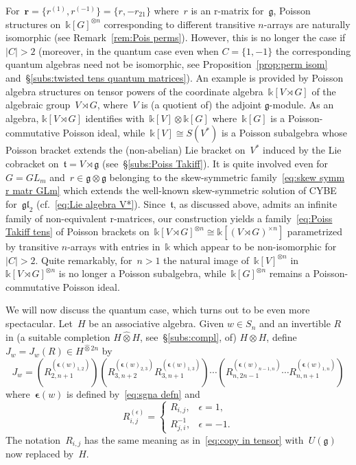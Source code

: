 \documentclass[12pt, reqno]{amsart}
\theoremstyle{definition}
\numberwithin{equation}{section}
\newcommand{\tensor}{\otimes}
\newcommand{\kk}{\mathbb{k}}\newcommand{\lie}[1]{{\mathfrak{#1}}}
\newcommand{\sgna}[1]{\boldsymbol{\epsilon}(#1)}
\begin{document}
For~$\mathbf r=
\{r^{(1)},r^{(-1)}\}=
\{r,-r_{21}\}$ where~$r$ is an r-matrix for~$\lie g$, Poisson structures on~$\kk[G]^{\tensor n}$ 
corresponding to
different transitive $n$-arrays are naturally isomorphic
(see Remark~\ref{rem:Pois perms}). However, this is no longer the case if~$|C|>2$ 
(moreover, in the quantum case even when $C=\{1,-1\}$ the corresponding quantum algebras need not be isomorphic, see Proposition~\ref{prop:perm isom}
and~\S\ref{subs:twisted tens quantum matrices}). An example is provided by
Poisson algebra structures on tensor powers of
the coordinate algebra~$\kk[V\rtimes G]$ of the 
algebraic group~$V\rtimes G$, where~$V$ is (a quotient of) the adjoint $\lie g$-module. 
As an algebra, $\kk[V\rtimes G]$ identifies with~$\kk[V]\tensor \kk[G]$ where~$\kk[G]$ is 
a Poisson-commutative Poisson ideal, while~$\kk[V]\cong S(V^*)$ is a Poisson subalgebra whose Poisson bracket extends the (non-abelian) Lie bracket
on~$V^*$ induced by the Lie cobracket
on~$\lie t=V\rtimes \lie g$ (see~\S\ref{subs:Poiss Takiff}). It is quite involved even for~$G=GL_m$ and~$r\in\lie g\tensor\lie g$ belonging to the skew-symmetric family~\eqref{eq:skew symm r matr GLm} which extends the
well-known skew-symmetric solution of CYBE for~$\lie{gl}_2$
(cf.~\eqref{eq:Lie algebra V*}). Since~$\lie t$,
as discussed above, admits an infinite family of non-equivalent r-matrices,
our construction yields a family~\eqref{eq:Poiss Takiff tens} of 
Poisson brackets on~$\kk[V\rtimes G]^{\tensor n}
\cong\kk[(V\rtimes G)^{\times n}]$ parametrized
by transitive $n$-arrays with entries in~$\kk$ which appear to be non-isomorphic
for~$|C|>2$.
Quite remarkably, for~$n>1$ the natural image of~$\kk[V]^{\tensor n}$ in~$\kk[V\rtimes G]^{\tensor n}$
is no longer a Poisson subalgebra, while~$\kk[G]^{\tensor n}$
remains a Poisson-commutative Poisson ideal. 

We will now discuss the quantum case, which turns out
to be even more spectacular. 
Let~$H$ be an associative algebra.
Given $w\in S_n$
and an invertible $R$ in (a suitable completion $H\widehat\tensor H$, see~\S\ref{subs:compl}, of) $H\tensor H$, define 
$J_w=J_w(R)\in H^{\widehat\tensor 2n}$ by 
$$
J_w=(R_{2,n+1}^{(\sgna w_{1,2})})
(R_{3,n+2}^{(\sgna w_{2,3})}R_{3,n+1}^{(\sgna w_{1,3})})\cdots 
(R_{n,2n-1}^{(\sgna w_{n-1,n})}\cdots R_{n,n+1}^{(\sgna w_{1,n})})
$$
where~$\sgna w$ is defined by~\eqref{eq:sgna defn} and
$$
R_{i,j}^{(\epsilon)}=\begin{cases}
R_{i,j},&\epsilon=1,\\
R_{j,i}^{-1},&\epsilon=-1.
\end{cases}
$$
The notation~$R_{i,j}$ has the same meaning as in~\eqref{eq:copy in tensor} with~$U(\lie g)$ now replaced by~$H$.
\end{document}
